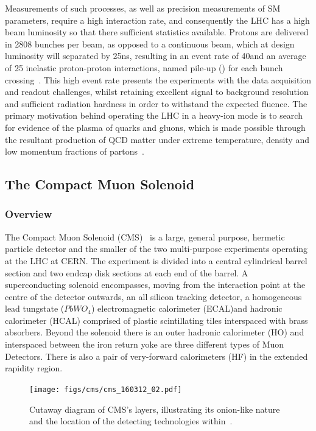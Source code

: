 Measurements of such processes, as well as precision measurements of SM parameters, require a high interaction rate, and consequently the LHC has a high beam luminosity so that there sufficient statistics available.
Protons are delivered in 2808 bunches per beam, as opposed to a continuous beam, which at design luminosity will separated by 25ns, resulting in an event rate of 40\MHz and an average of 25 inelastic proton-proton interactions, named pile-up (\PU) for each bunch crossing~\cite{Bruning:782076,Ball:2007zza}. 
This high event rate presents the experiments with the data acquisition and readout challenges, whilst retaining excellent signal to background resolution and sufficient radiation hardness in order to withstand the expected fluence.
The primary motivation behind operating the LHC in a heavy-ion mode is to search for evidence of the plasma of quarks and gluons, which is made possible through the resultant production of QCD matter under extreme temperature, density and low momentum fractions of partons~\cite{Baur:687318}.

\subsection{The Compact Muon Solenoid}\label{subsec:cms}
\subsubsection{Overview}
The Compact Muon Solenoid (CMS)~\cite{oldcms} is a large, general purpose, hermetic particle detector and the smaller of the two multi-purpose experiments operating at the LHC at CERN.
The experiment is divided into a central cylindrical barrel section and two endcap disk sections at each end of the barrel.
A superconducting solenoid encompasses, moving from the interaction point at the centre of the detector outwards, an all silicon tracking detector, a homogeneous lead tungstate ($PbWO_{4}$) electromagnetic calorimeter (ECAL)and hadronic calorimeter (HCAL) comprised of plastic scintillating tiles interspaced with brass absorbers.
Beyond the solenoid there is an outer hadronic calorimeter (HO) and interspaced between the iron return yoke are three different types of Muon Detectors.
There is also a pair of very-forward calorimeters (HF) in the extended rapidity region.

\begin{figure}[htbp]
\begin{center}
\texttt{[image: figs/cms/cms\_160312\_02.pdf]}
\caption{Cutaway diagram of CMS’s layers, illustrating its onion-like nature and the location of the detecting technologies within~\cite{Sakuma:2013jqa}.}
\label{fig:cern-accelerator-complex}
\end{center}
\end{figure}

